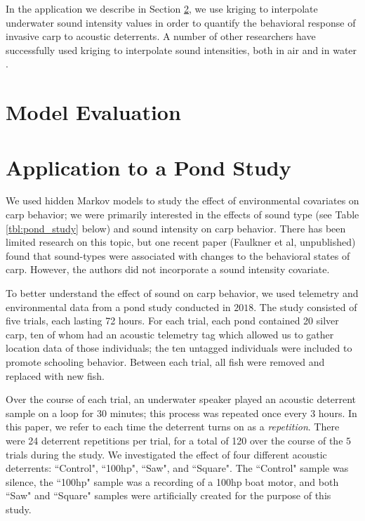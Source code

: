 \documentclass[12pt]{article}
\begin{document}
	In the application we describe in Section \ref{sec:pond-study}, we use kriging to interpolate underwater sound intensity values in order to quantify the behavioral response of invasive carp to acoustic deterrents. A number of other researchers have successfully used kriging to interpolate sound intensities, both in air \cite{Baume2008, Bostanci2018} and in water \cite{Sun2018}.
	
	\section{Model Evaluation}
	
	\section{Application to a Pond Study} \label{sec:pond-study}
		
	We used hidden Markov models to study the effect of environmental covariates on carp behavior; we were primarily interested in the effects of sound type (see Table \ref{tbl:pond_study} below) and sound intensity on carp behavior. There has been limited research on this topic, but one recent paper (Faulkner et al, unpublished) found that sound-types were associated with changes to the behavioral states of carp. However, the authors did not incorporate a sound intensity covariate.
	
	To better understand the effect of sound on carp behavior, we used telemetry and environmental data from a pond study conducted in $2018$. The study consisted of five trials, each lasting 72 hours. For each trial, each pond contained 20 silver carp, ten of whom had an acoustic telemetry tag which allowed us to gather location data of those individuals; the ten untagged individuals were included to promote schooling behavior. Between each trial, all fish were removed and replaced with new fish.
	
	Over the course of each trial, an underwater speaker played an acoustic deterrent sample on a loop for 30 minutes; this process was repeated once every 3 hours. In this paper, we refer to each time the deterrent turns on as a \emph{repetition}. There were 24 deterrent repetitions per trial, for a total of 120 over the course of the $5$ trials during the study. We investigated the effect of four different acoustic deterrents: ``Control", ``100hp", ``Saw", and ``Square". The ``Control" sample was silence, the ``100hp" sample was a recording of a 100hp boat motor, and both ``Saw" and ``Square" samples were artificially created for the purpose of this study.
	
\end{document}
